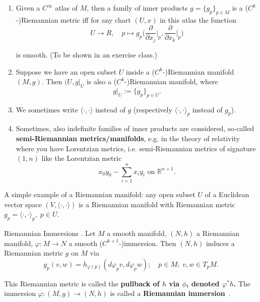 \documentclass{article}
\begin{document}
\begin{enumerate}
  \item Given a $C^{\infty}$ atlas of $M$, then a family of inner products $g = \{ g_p \}_{p \in M}$ is a ($C^k$-)Riemannian metric iff for any chart $(U, x)$ in this atlas the function
    \begin{equation}
      U \rightarrow R, \quad p \mapsto g_p\Big( \frac{\partial}{\partial x_j}\Big|_p, \frac{\partial}{\partial x_k}\Big|_p \Big)
    \end{equation}

    is smooth. (To be shown in an exercise class.)
  \item Suppose we have an open subset $U$ inside a ($C^k$-)Riemannian manifold $(M, g)$. Then $(U, g|_U$ is also a ($C^k$-)Riemannian manifold, where
  \begin{equation}
    g|_U:= \{ g_p\}_{p \in U}.
  \end{equation}
  \item We sometimes write $\langle \cdot , \cdot \rangle$ instead of $g$ (respectively $\langle \cdot , \cdot \rangle_{p}$ instead of $g_p$). 
  \item Sometimes, also indefinite families of inner products are considered, so-called \textbf{semi-Riemannian metrics/manifolds}, e.g. in the theory of relativity where you have Lorentzian metrics, i.e. semi-Riemannian metrics of signature $(1, n)$ like the Lorentzian metric
    \begin{equation}
      x_0y_0 - \sum\limits_{i = 1}^nx_i y_i \text{ on } \mathbb{R}^{n+1}.
    \end{equation}

\end{enumerate}

A simple example of a Riemannian manifold: any open subset $U$ of a Euclidean vector space $(V, \langle \cdot , \cdot \rangle)$ is a Riemannian manifold with Riemannian metric $g_p = \langle \cdot , \cdot \rangle_p, \; p \in U$.

\begin{Proposition}{Riemannian Immersions}
.  Let $M$ a smooth manifold, $(N, h)$ a Riemannian manifold, $\varphi : M \rightarrow N$ a smooth ($C^{k+1}$-)immersion. Then $(N, h)$ induces a Riemannian metric $g$ on $M$ via
   \begin{equation}
     g_p(v, w) = h_{\varphi(p)}(d\varphi_pv, d\varphi_pw) ; \quad p \in M; \; v, w \in T_pM.
   \end{equation}

   This Riemannian metric is called the \textbf{pullback of $h$ via $\phi$, denoted $\varphi^{*}h$.} The immersion $\varphi: (M, g) \rightarrow (N, h)$ is called a \textbf{Riemannian immersion}~.
\end{Proposition}
\end{document}
